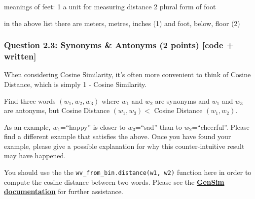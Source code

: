 \documentclass[11pt]{article}
\begin{document}
    meanings of feet: 1 a unit for measuring distance 2 plural form of foot

in the above list there are meters, metres, inches (1) and foot, below,
floor (2)

    \hypertarget{question-2.3-synonyms-antonyms-2-points-code-written}{%
\subsubsection{Question 2.3: Synonyms \& Antonyms (2 points) {[}code +
written{]}}\label{question-2.3-synonyms-antonyms-2-points-code-written}}

When considering Cosine Similarity, it's often more convenient to think
of Cosine Distance, which is simply 1 - Cosine Similarity.

Find three words \((w_1,w_2,w_3)\) where \(w_1\) and \(w_2\) are
synonyms and \(w_1\) and \(w_3\) are antonyms, but Cosine Distance
\((w_1,w_3) <\) Cosine Distance \((w_1,w_2)\).

As an example, \(w_1\)=``happy'' is closer to \(w_3\)=``sad'' than to
\(w_2\)=``cheerful''. Please find a different example that satisfies the
above. Once you have found your example, please give a possible
explanation for why this counter-intuitive result may have happened.

You should use the the \texttt{wv\_from\_bin.distance(w1,\ w2)} function
here in order to compute the cosine distance between two words. Please
see the
\textbf{\href{https://radimrehurek.com/gensim/models/keyedvectors.html\#gensim.models.keyedvectors.FastTextKeyedVectors.distance}{GenSim
documentation}} for further assistance.
\end{document}
